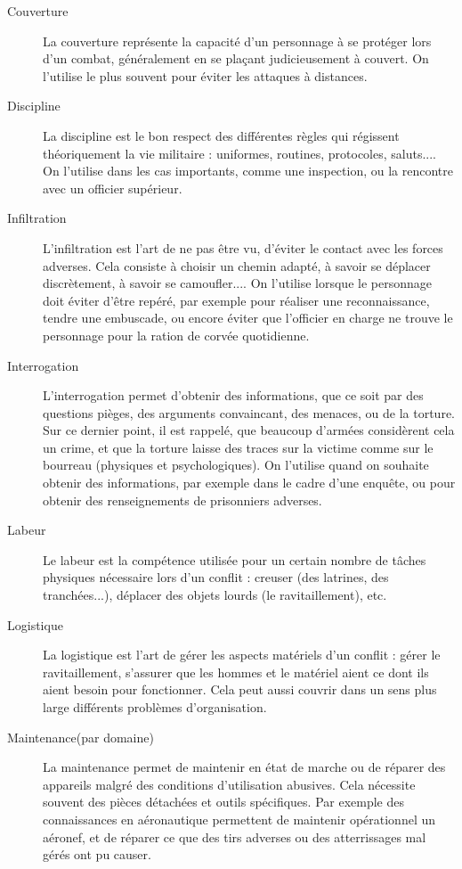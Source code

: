 \documentclass{report}
\begin{document}
\begin{multicols}{2}
\begin{description}
    \item[Couverture] La couverture représente la capacité d'un personnage à se protéger lors d'un combat, généralement en se plaçant judicieusement à couvert. On l'utilise le plus souvent pour éviter les attaques à distances.
    \item[Discipline] La discipline est le bon respect des différentes règles qui régissent théoriquement la vie militaire : uniformes, routines, protocoles, saluts.... On l'utilise dans les cas importants, comme une inspection, ou la rencontre avec un officier supérieur.
    \item[Infiltration]L'infiltration est l'art de ne pas être vu, d'éviter le contact avec les forces adverses. Cela consiste à choisir un chemin adapté, à savoir se déplacer discrètement, à savoir se camoufler.... On l'utilise lorsque le personnage doit éviter d'être repéré, par exemple pour réaliser une reconnaissance, tendre une embuscade, ou encore éviter que l'officier en charge ne trouve le personnage pour la ration de corvée quotidienne.
    \item[Interrogation] L'interrogation permet d'obtenir des informations, que ce soit par des questions pièges, des arguments convaincant, des menaces, ou de la torture. Sur ce dernier point, il est rappelé, que beaucoup d'armées considèrent cela un crime, et que la torture laisse des traces sur la victime comme sur le bourreau (physiques et psychologiques). On l'utilise quand on souhaite obtenir des informations, par exemple dans le cadre d'une enquête, ou pour obtenir des renseignements de prisonniers adverses.
    \item[Labeur] Le labeur est la compétence utilisée pour un certain nombre de tâches physiques nécessaire lors d'un conflit : creuser (des latrines, des tranchées...), déplacer des objets lourds (le ravitaillement), etc.
    \item[Logistique] La logistique est l'art de gérer les aspects matériels d'un conflit : gérer le ravitaillement, s'assurer que les hommes et le matériel aient ce dont ils aient besoin pour fonctionner. Cela peut aussi couvrir dans un sens plus large différents problèmes d'organisation.
    \item[Maintenance(par domaine)]La maintenance permet de maintenir en état de marche ou de réparer des appareils malgré des conditions d'utilisation abusives. Cela nécessite souvent des pièces détachées et outils spécifiques. Par exemple des connaissances en aéronautique permettent de maintenir opérationnel un aéronef, et de réparer ce que des tirs adverses ou des atterrissages mal gérés ont pu causer.

\end{description}
\end{multicols}
\end{document}
